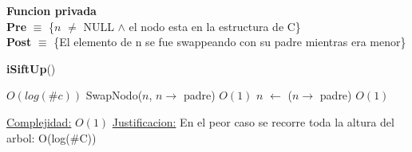 \begin{Algoritmos}
$ $\newline

\textbf{Funcion privada}\\
\textbf{Pre} $\equiv$ \{$n$ $\neq$ NULL $\land$ el nodo esta en la estructura de C\}\\%
\textbf{Post} $\equiv$ \{El elemento de n se fue swappeando con su padre mientras era menor\}%
\begin{algorithm}[H]
{\textbf{iSiftUp}()}
\begin{algorithmic}[1]

     \Comment $O(log(\#c))$
        \State SwapNodo($n$, $n \to$ padre) \Comment $O(1)$
        \State $n$ $\gets$ ($n \to$ padre) \Comment $O(1)$
    \EndWhile

    \medskip
    \Statex \underline{Complejidad:} $O(1)$
    \Statex \underline{Justificacion:} En el peor caso se recorre toda la altura del arbol: O(log($\#$C))
\end{algorithmic}
\end{algorithm}




\end{Algoritmos}
